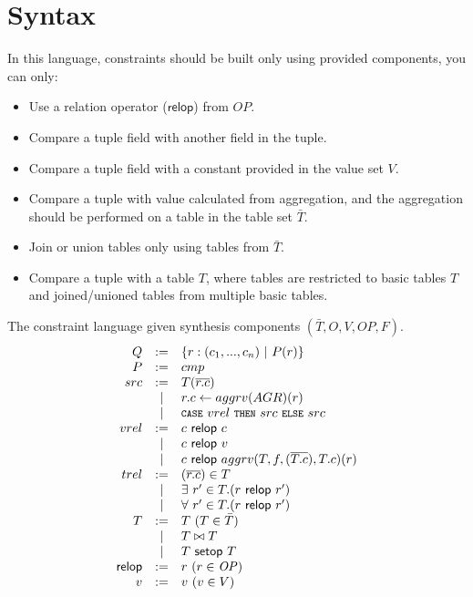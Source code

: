 \documentclass[letter, notitlepage]{article}
\newcommand{\code}[1]{\texttt{\footnotesize #1}}
\begin{document}
\section{Syntax}

In this language, constraints should be built only using provided components, you can only:
\begin{itemize}
\item Use a relation operator ($\mathsf{relop}$) from $\mathit{OP}$.
\item Compare a tuple field with another field in the tuple.
\item Compare a tuple field with a constant provided in the value set $V$.
\item Compare a tuple with value calculated from aggregation, and the aggregation should be performed on a table in the table set $\bar{T}$.
\item Join or union tables only using tables from $\bar{T}$.
\item Compare a tuple with a table $T$, where tables are restricted to basic tables $T$ and joined/unioned tables from multiple basic tables.  
\end{itemize} 

The constraint language given synthesis components $(\bar{T}, O, V, \mathit{OP}, F)$.
\[
\begin{array}{rcl}
Q & := & \left\{r:(c_1,...,c_n) ~|~ P(r) \right\}\\
P & := & cmp\\
src & := & T(\overline{r.c})\\
		& | & r.c \leftarrow aggrv(AGR)(r)\\
		& | & \code{CASE}~vrel~\code{THEN}~src~\code{ELSE}~src\\
vrel & := & c~\mathsf{relop}~c\\
		& |  & c~\mathsf{relop}~v\\
		& |  & c~\mathsf{relop}~aggrv(T, f, (\overline{T.c}), T.c)(r)\\
trel & := & (\overline{r.c})\in T\\
		 & |  & \exists~r'\in T.(r~\mathsf{relop}~r')\\
		 & |  & \forall~r'\in T.(r~\mathsf{relop}~r')\\
T 	& := & T~(T\in \bar{T})\\
		& |  & T \bowtie T\\
		& |  & T~\mathsf{setop}~T\\
\mathsf{relop} & := & r~ (r\in \mathit{OP})\\ 
v 	& := & v~(v\in V)
\end{array}
\]
\end{document}
